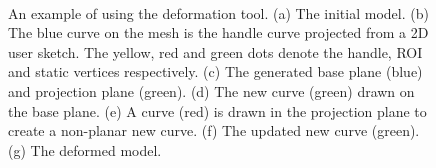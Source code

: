 \begin{figure} [htbp]
  \centering
    \\
  \caption{An example of using the deformation tool. (a) The initial model. (b) The blue curve on the mesh is the handle curve projected from a 2D user sketch. The yellow, red and green dots denote the handle, ROI and static vertices respectively. (c) The generated base plane (blue) and projection plane (green). (d) The new curve (green) drawn on the base plane. (e) A curve (red) is drawn in the projection plane to create a non-planar new curve. (f) The updated new curve (green). (g) The deformed model.}
  \label{fig:uideformhandle} %
\end{figure}

